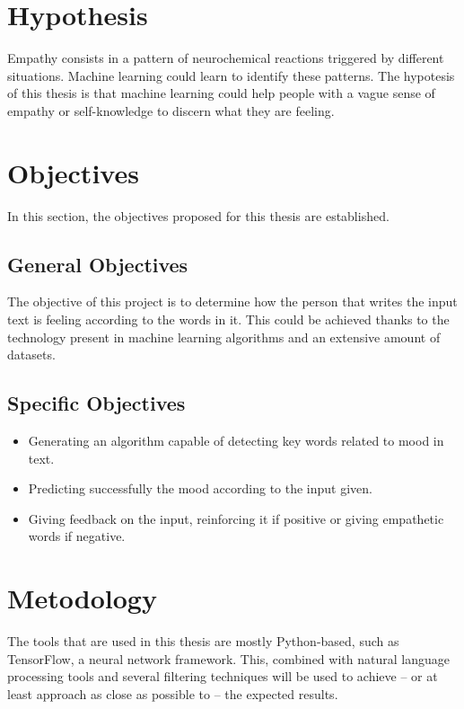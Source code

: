 \section{Hypothesis}
Empathy consists in a pattern of neurochemical reactions triggered by different situations. Machine learning could learn to identify these patterns. The hypotesis of this thesis is that machine learning could help people with a vague sense of empathy or self-knowledge to discern what they are feeling.

\section{Objectives}
In this section, the objectives proposed for this thesis are established.

\subsection{General Objectives}
The objective of this project is to determine how the person that writes the input text is feeling according to the words in it. This could be achieved thanks to the technology present in machine learning algorithms and an extensive amount of datasets.

\subsection{Specific Objectives}
\begin{itemize}
	\item Generating an algorithm capable of detecting key words related to mood in text.
	\item Predicting successfully the mood according to the input given.
	\item Giving feedback on the input, reinforcing it if positive or giving empathetic words if negative.
\end{itemize}

\section{Metodology}
The tools that are used in this thesis are mostly Python-based, such as TensorFlow, a neural network framework. This, combined with natural language processing tools and several filtering techniques will be used to achieve -- or at least approach as close as possible to -- the expected results.


